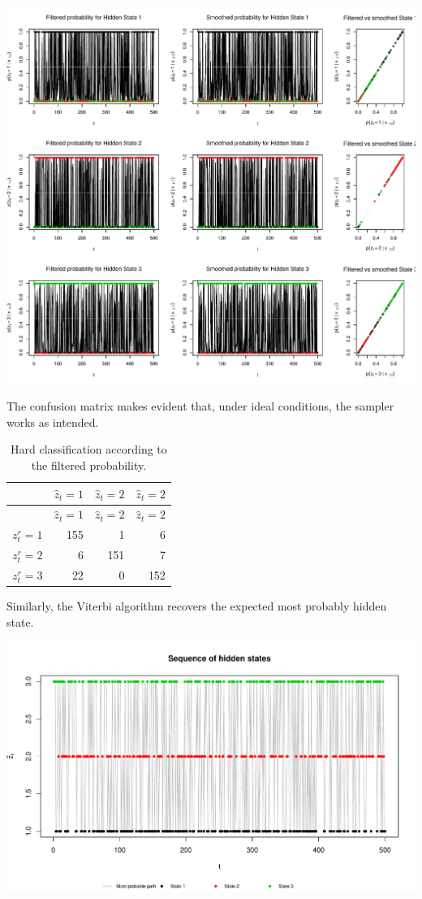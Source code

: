 \documentclass[]{article}
\begin{document}
{{{\includegraphics[width=\textwidth]{main_pdf_files/figure-latex/iohmm_walkthrough_stateprobability-1}

The confusion matrix makes evident that, under ideal conditions, the
sampler works as intended.

\begin{longtable}[]{@{}lrrr@{}}
\caption{Hard classification according to the filtered
probability.}\tabularnewline
\toprule
& \(\hat{z}_t = 1\) & \(\hat{z}_t = 2\) &
\(\hat{z}_t = 2\)\tabularnewline
\midrule
\endfirsthead
\toprule
& \(\hat{z}_t = 1\) & \(\hat{z}_t = 2\) &
\(\hat{z}_t = 2\)\tabularnewline
\midrule
\endhead
\(z^r_t = 1\) & 155 & 1 & 6\tabularnewline
\(z^r_t = 2\) & 6 & 151 & 7\tabularnewline
\(z^r_t = 3\) & 22 & 0 & 152\tabularnewline
\bottomrule
\end{longtable}

Similarly, the Viterbi algorithm recovers the expected most probably
hidden state.

\includegraphics[width=\textwidth]{main_pdf_files/figure-latex/iohmm_walkthrough_statepath-1}

}}}
\end{document}
